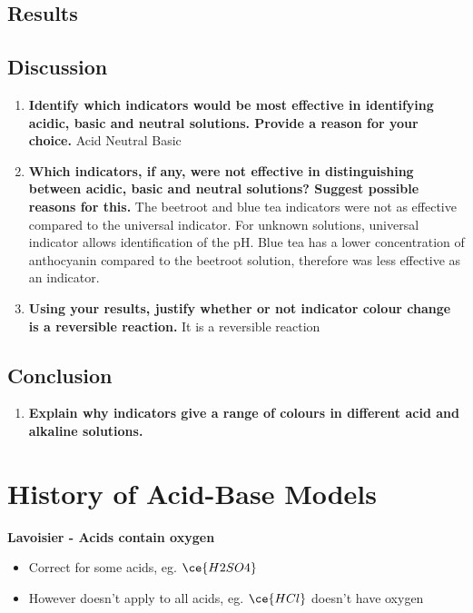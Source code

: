	\subsection{Results}

	\subsection{Discussion}
		\begin{enumerate}
			\item \textbf{Identify which indicators would be most effective in identifying acidic, basic and neutral solutions. Provide 
			a reason for your choice.}
			Acid
			Neutral
			Basic
			\item \textbf{Which indicators, if any, were not effective in distinguishing between acidic, basic and neutral solutions? 
			Suggest possible reasons for this.}
			\subitem The beetroot and blue tea indicators were not as effective compared to the universal indicator. For unknown solutions, universal indicator allows identification of the pH. Blue tea has a lower concentration of anthocyanin compared to the beetroot solution, therefore was less effective as an indicator.
			\item \textbf{Using your results, justify whether or not indicator colour change is a reversible reaction.}
			\subitem It is a reversible reaction
		\end{enumerate}
	
	\subsection{Conclusion}
	\begin{enumerate}
		\item \textbf{Explain why indicators give a range of colours in different acid and alkaline solutions.}
	\end{enumerate}

\section{History of Acid-Base Models} \label{10/02/2025}
	\textbf{Lavoisier - Acids contain oxygen}
	\begin{itemize}
		\item Correct for some acids, eg. $\ce{H2SO4}$
		\item However doesn't apply to all acids, eg. $\ce{HCl}$ doesn't have oxygen
	\end{itemize}

